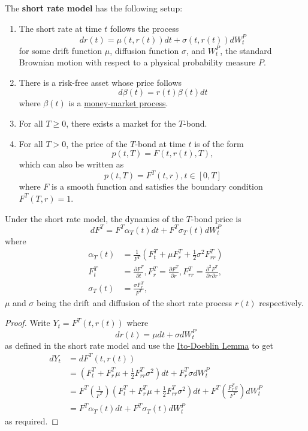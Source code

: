 \documentclass[11pt,fleqn]{book} %
\begin{document}
\begin{definition} \label{def:521}
The \textbf{short rate model} has the following setup:
\begin{enumerate}
\item The short rate at time \(t\) follows the process
\[
dr(t) = \mu(t, r(t))dt + \sigma(t, r(t))dW_t^P
\]
for some drift function \(\mu\), diffusion function \(\sigma\), and \(W_t^P\), the standard Brownian motion with respect to a physical probability measure \(P\).
\item There is a risk-free asset whose price follows
\[
d\beta(t) = r(t)\beta(t)dt
\]
where \(\beta(t)\) is a \hyperref[def:5110]{money-market process}.
\item For all \(T \geq 0\), there exists a market for the \(T\)-bond.
\item For all \(T > 0\), the price of the \(T\)-bond at time \(t\) is of the form
\[
p(t, T) = F(t, r(t), T),
\]
which can also be written as
\[
p(t, T) = F^T(t, r), t \in [0, T]
\]
where \(F\) is a smooth function and satisfies the boundary condition \(F^T(T, r) = 1\).
\end{enumerate}
\end{definition}

\begin{proposition} \label{prop:522}
Under the short rate model, the dynamics of the \(T\)-bond price is
\[
dF^T = F^T\alpha_T(t)dt + F^T\sigma_T(t)dW_t^P
\]
where
\[
\begin{aligned}
\alpha_T(t) &= \frac{1}{F^T}\left(F_t^T + \mu F_r^T + \frac12 \sigma^2F_{rr}^T\right) \\
F_t^T &= \frac{\partial F^T}{\partial t}, F_r^T = \frac{\partial F^T}{\partial r}, F_{rr}^T = \frac{\partial^2 F^T}{\partial r\partial r}, \\
\sigma_T(t) &= \frac{\sigma F_r^T}{F^T},
\end{aligned}
\]
\(\mu\) and \(\sigma\) being the drift and diffusion of the short rate process \(r(t)\) respectively.
\end{proposition}
\begin{proof}
Write \(Y_t = F^T(t, r(t))\) where
\[
dr(t) = \mu dt + \sigma dW_t^P
\]
as defined in the short rate model and use the \hyperref[thm:339]{Ito-Doeblin Lemma} to get
\[
\begin{aligned}
dY_t &= dF^T(t, r(t)) \\
&= \left(F_t^T + F_r^T\mu + \frac12 F_{rr}^T\sigma^2\right)dt + F_r^T\sigma dW_t^P \\
&= F^T\left(\frac{1}{F^T}\right)\left(F_t^T + F_r^T\mu + \frac12 F_{rr}^T\sigma^2\right)dt + F^T\left(\frac{F_r^T\sigma}{F^T}\right)dW_t^P \\
&= F^T\alpha_T(t)dt + F^T\sigma_T(t) dW_t^P
\end{aligned}
\]
as required.
\end{proof}
\end{document}
